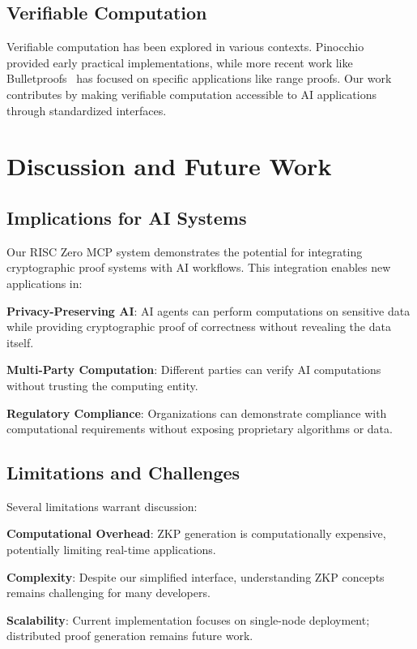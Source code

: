 \documentclass[11pt]{article}
\begin{document}
\subsection{Verifiable Computation}

Verifiable computation has been explored in various contexts. Pinocchio~\cite{pinocchio} provided early practical implementations, while more recent work like Bulletproofs~\cite{bulletproofs} has focused on specific applications like range proofs. Our work contributes by making verifiable computation accessible to AI applications through standardized interfaces.

\section{Discussion and Future Work}

\subsection{Implications for AI Systems}

Our RISC Zero MCP system demonstrates the potential for integrating cryptographic proof systems with AI workflows. This integration enables new applications in:

\textbf{Privacy-Preserving AI}: AI agents can perform computations on sensitive data while providing cryptographic proof of correctness without revealing the data itself.

\textbf{Multi-Party Computation}: Different parties can verify AI computations without trusting the computing entity.

\textbf{Regulatory Compliance}: Organizations can demonstrate compliance with computational requirements without exposing proprietary algorithms or data.

\subsection{Limitations and Challenges}

Several limitations warrant discussion:

\textbf{Computational Overhead}: ZKP generation is computationally expensive, potentially limiting real-time applications.

\textbf{Complexity}: Despite our simplified interface, understanding ZKP concepts remains challenging for many developers.

\textbf{Scalability}: Current implementation focuses on single-node deployment; distributed proof generation remains future work.
\end{document}
